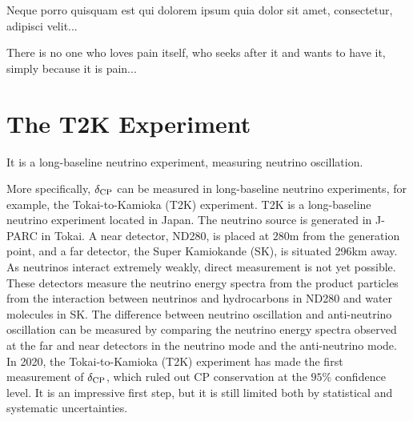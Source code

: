 \begin{savequote}[8cm]
\textlatin{Neque porro quisquam est qui dolorem ipsum quia dolor sit amet, consectetur, adipisci velit...}

There is no one who loves pain itself, who seeks after it and wants to have it, simply because it is pain...
\end{savequote}

\chapter{\label{ch:3-t2k}The T2K Experiment} 

\minitoc

It is a long-baseline neutrino experiment, measuring neutrino oscillation.

More specifically, $\delta_\textrm{CP}$ can be measured in long-baseline neutrino experiments, for example, the Tokai-to-Kamioka (T2K) experiment\cite{T2KEXP}. 
T2K is a long-baseline neutrino experiment located in Japan. 
The neutrino source is generated in J-PARC in Tokai. 
A near detector, ND280, is placed at $280\mathrm{m}$ from the generation point, and a far detector, the Super Kamiokande (SK), is situated 296km away. As neutrinos interact extremely weakly, direct measurement is not yet possible. These detectors measure the neutrino energy spectra from the product particles from the interaction between neutrinos and hydrocarbons in ND280 and water molecules in SK. The difference between neutrino oscillation and anti-neutrino oscillation can be measured by comparing the neutrino energy spectra observed at the far and near detectors in the neutrino mode and the anti-neutrino mode. In 2020, the Tokai-to-Kamioka (T2K) experiment\cite{T2KEXP} has made the first measurement of $\delta_\textrm{CP}$\cite{T2Knature}, which ruled out CP conservation at the $95\%$ confidence level. It is an impressive first step, but it is still limited both by statistical and systematic uncertainties. 

 